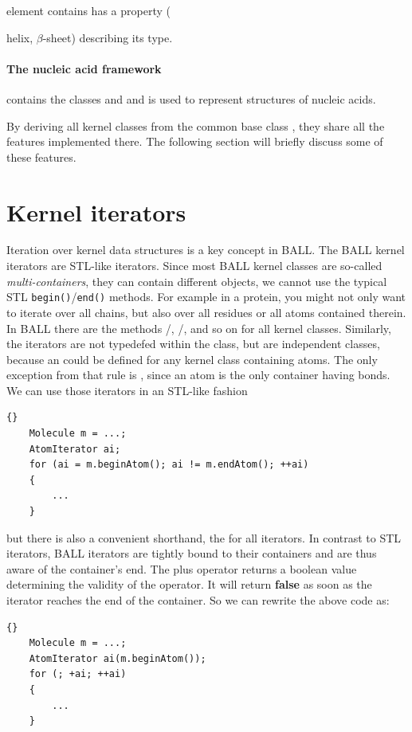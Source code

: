 element contains has a property ({\eg helix, $\beta$-sheet) describing its type.

\paragraph{The nucleic acid framework} contains the classes 
and  and is used to represent structures of nucleic acids.

By deriving all kernel classes from the common base class ,
they share all the features implemented there. The following section will
briefly discuss some of these features.

\section{Kernel iterators}
Iteration over kernel data structures is a key concept in BALL.
The BALL kernel iterators are STL-like iterators. Since most BALL kernel
classes are so-called {\em multi-containers}, \ie they can contain different
objects, we cannot use the typical STL {\tt begin()}/{\tt end()} methods.
For example in a protein, you might not only want to iterate over all chains,
but also over all residues or all atoms contained therein. In BALL there
are the methods /,
/, and so on for all
kernel classes. Similarly, the iterators are not typedefed within the class,
but are independent classes, because an  could be defined
for any kernel class containing atoms. The only exception from that rule
is , since an atom is the only container having
bonds. We can use those iterators in an STL-like fashion
\\
\begin{lstlisting}{}
	Molecule m = ...;
	AtomIterator ai;
	for (ai = m.beginAtom(); ai != m.endAtom(); ++ai)
	{
		...
	}
\end{lstlisting}
\noindent but there is also a convenient shorthand, the 
for all iterators. In contrast to STL iterators, BALL iterators are tightly 
bound to their containers and are thus aware of the container's end.
The plus operator returns a boolean value determining the validity of the
operator. It will return {\bf false} as soon as the iterator reaches the
end of the container. So we can rewrite the above code as:
\\
\begin{lstlisting}{}
	Molecule m = ...;
	AtomIterator ai(m.beginAtom());
	for (; +ai; ++ai)
	{
		...
	}
\end{lstlisting}

}
